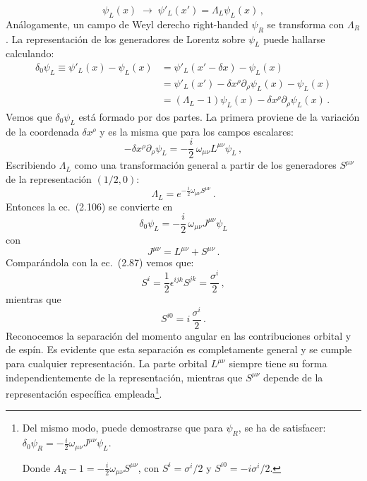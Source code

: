 \documentclass[a4paper,11pt]{book} %
\begin{document}
\begin{equation}
\psi_{L}(x)\;\rightarrow\;\psi'_{L}(x')=\Lambda_{L}\psi_{L}(x)\,,
\end{equation}
\noindent
Análogamente, un campo de Weyl derecho
right-handed $\psi_{R}$ se transforma con $\Lambda_{R}$.
\medskip\newline
La representación de los generadores de Lorentz sobre $\psi_{L}$ puede hallarse calculando:
\begin{equation}
\begin{aligned}
\delta_{0}\psi_{L}\equiv\psi'_{L}(x)-\psi_{L}(x)
&=\psi'_{L}(x'-\delta x)-\psi_{L}(x)\\
&=\psi'_{L}(x')-\delta x^{\rho}\partial_{\rho}\psi_{L}(x)-\psi_{L}(x)\\
&=(\Lambda_{L}-1)\psi_{L}(x)-\delta x^{\rho}\partial_{\rho}\psi_{L}(x)\,.
\end{aligned}
\end{equation}
\noindent
Vemos que $\delta_{0}\psi_{L}$ está formado por dos partes. La primera
proviene de la
variación de la coordenada $\delta x^{\rho}$ y es la misma que para los campos
escalares:
\begin{equation}
-\delta x^{\rho}\partial_{\rho}\psi_{L}=-\frac{i}{2}\,\omega_{\mu\nu}L^{\mu\nu}\psi_{L}\,,
\end{equation}
\noindent
Escribiendo $\Lambda_{L}$ como una transformación general a partir de los generadores $S^{\mu\nu}$ de la representación $(1/2, 0)$:
\begin{equation}
\Lambda_{L}=e^{-\frac{i}{2}\omega_{\mu\nu}S^{\mu\nu}}\,.
\end{equation}
\noindent
Entonces la ec.~(2.106) se convierte en
\begin{equation}
\delta_{0}\psi_{L}=-\frac{i}{2}\,\omega_{\mu\nu}J^{\mu\nu}\psi_{L}
\end{equation}
 \noindent
con
\begin{equation}
J^{\mu\nu}=L^{\mu\nu}+S^{\mu\nu}\,.
\end{equation}
 \noindent
Comparándola con la ec.~(2.87) vemos que:
\begin{equation}
S^{i}=\frac{1}{2}\epsilon^{ijk}S^{jk}=\frac{\sigma^{i}}{2}\,,
\end{equation}
 \noindent
mientras que
\begin{equation}
S^{i0}=i\,\frac{\sigma^{i}}{2}\,.
\end{equation}
\noindent
Reconocemos la separación del momento angular en las
contribuciones orbital y de espín. Es evidente que esta separación es
completamente general y se cumple para cualquier representación. La parte
orbital $L^{\mu\nu}$ siempre tiene su forma independientemente de la
representación, mientras que $S^{\mu\nu}$ depende de la representación
específica empleada\footnote{Del mismo modo, puede demostrarse que para $\psi_{R}$, se ha de satisfacer: $\delta_{0}\psi_{R}=-\frac{i}{2}\omega_{\mu\nu}J^{\mu\nu}\psi_{L}$. 

Donde $A_R-1=-\frac{i}{2}\omega_{\mu\nu}S^{\mu\nu}$, con $S^i=\sigma^i/2$ y $S^{i0}=-i\sigma^i/2$.}.
 
\end{document}
